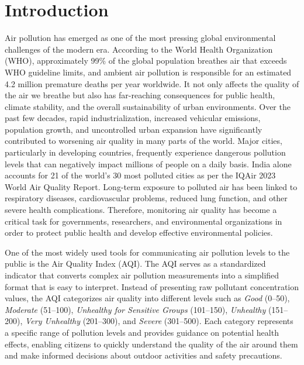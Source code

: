 \documentclass[conference]{IEEEtran}
\begin{document}
\section{Introduction}

Air pollution has emerged as one of the most pressing global environmental
challenges of the modern era. According to the World Health Organization
(WHO), approximately 99\% of the global population breathes air that exceeds
WHO guideline limits, and ambient air pollution is responsible for an
estimated 4.2 million premature deaths per year worldwide. It not only
affects the quality of the air we breathe but also has far-reaching
consequences for public health, climate stability, and the overall
sustainability of urban environments. Over the past few decades, rapid
industrialization, increased vehicular emissions, population growth, and
uncontrolled urban expansion have significantly contributed to worsening air
quality in many parts of the world. Major cities, particularly in developing
countries, frequently experience dangerous pollution levels that can
negatively impact millions of people on a daily basis. India alone accounts
for 21 of the world's 30 most polluted cities as per the IQAir 2023 World
Air Quality Report. Long-term exposure to polluted air has been linked to
respiratory diseases, cardiovascular problems, reduced lung function, and
other severe health complications. Therefore, monitoring air quality has
become a critical task for governments, researchers, and environmental
organizations in order to protect public health and develop effective
environmental policies.

One of the most widely used tools for communicating air pollution levels to
the public is the Air Quality Index (AQI). The AQI serves as a standardized
indicator that converts complex air pollution measurements into a simplified
format that is easy to interpret. Instead of presenting raw pollutant
concentration values, the AQI categorizes air quality into different levels
such as \textit{Good} (0--50), \textit{Moderate} (51--100), \textit{Unhealthy
for Sensitive Groups} (101--150), \textit{Unhealthy} (151--200), \textit{Very
Unhealthy} (201--300), and \textit{Severe} (301--500). Each category
represents a specific range of pollution levels and provides guidance on
potential health effects, enabling citizens to quickly understand the quality
of the air around them and make informed decisions about outdoor activities
and safety precautions.
\end{document}
